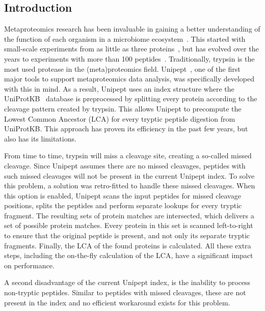\documentclass[11pt]{article}
\begin{document}
    \begin{multicols}{2}
        \section{Introduction}\label{sec:introduction}
        Metaproteomics research has been invaluable in gaining a better understanding of the function of each organism in a microbiome ecosystem~\cite{metaproteomics}.
        This started with small-scale experiments from as little as three proteins~\cite{small_experiment_metaproteomics}, but has evolved over the years to experiments with more than 100 peptides~\cite{large_experiment1_metaproteomics, large_experiment2_metaproteomics}.
        Traditionally, trypsin is the most used protease in the (meta)proteomics field.
        Unipept~\cite{unipept_desktop, unipept_api, unipept_4, unipept_orig, unipept_tutorial, unipept_web, unipept_cli, unipept_desktop_2}, one of the first major tools to support metaproteomics data analysis, was specifically developed with this in mind.
        As a result, Unipept uses an index structure where the UniProtKB~\cite{UniprotKB} database is preprocessed by splitting every protein according to the cleavage pattern created by trypsin.
        This allows Unipept to precompute the Lowest Common Ancestor (LCA) for every tryptic peptide digestion from UniProtKB\@.
        This approach has proven its efficiency in the past few years, but also has its limitations.

        From time to time, trypsin will miss a cleavage site, creating a so-called missed cleavage.
        Since Unipept assumes there are no missed cleavages, peptides with such missed cleavages will not be present in the current Unipept index.
        To solve this problem, a solution was retro-fitted to handle these missed cleavages.
        When this option is enabled, Unipept scans the input peptides for missed cleavage positions, splits the peptides and perform separate lookups for every tryptic fragment.
        The resulting sets of protein matches are intersected, which delivers a set of possible protein matches.
        Every protein in this set is scanned left-to-right to ensure that the original peptide is present, and not only its separate tryptic fragments.
        Finally, the LCA of the found proteins is calculated.
        All these extra steps, including the on-the-fly calculation of the LCA, have a significant impact on performance.

        A second disadvantage of the current Unipept index, is the inability to process non-tryptic peptides.
        Similar to peptides with missed cleavages, these are not present in the index and no efficient workaround exists for this problem.


\end{multicols}
\end{document}
